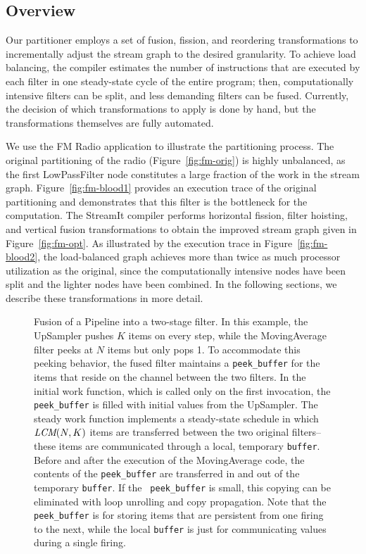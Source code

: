 \subsection{Overview}

Our partitioner employs a set of fusion, fission, and reordering
transformations to incrementally adjust the stream graph to the
desired granularity.  To achieve load balancing, the compiler
estimates the number of instructions that are executed by each filter
in one steady-state cycle of the entire program; then, computationally
intensive filters can be split, and less demanding filters can be
fused.  Currently, the decision of which transformations to apply is
done by hand, but the transformations themselves are fully automated.

We use the FM Radio application to illustrate the partitioning
process.  The original partitioning of the radio
(Figure~\ref{fig:fm-orig}) is highly unbalanced, as the first
LowPassFilter node constitutes a large fraction of the work in the
stream graph.  Figure~\ref{fig:fm-blood1} provides an execution trace
of the original partitioning and demonstrates that this filter is the
bottleneck for the computation.  The StreamIt compiler performs
horizontal fission, filter hoisting, and vertical fusion
transformations to obtain the improved stream graph given in
Figure~\ref{fig:fm-opt}.  As illustrated by the execution trace in
Figure~\ref{fig:fm-blood2}, the load-balanced graph achieves more than
twice as much processor utilization as the original, since the
computationally intensive nodes have been split and the lighter nodes
have been combined. In the following sections, we describe these
transformations in more detail.

\begin{figure}
\centering
{}
\vspace{-6pt}
\caption{\protect\small Fusion of a Pipeline into a two-stage filter.
In this example, the UpSampler pushes $K$ items on every step, while the
MovingAverage filter peeks at $N$ items but only pops 1.  To accommodate
this peeking behavior, the fused filter maintains a {\tt peek\_buffer}
for the items that reside on the channel between the two filters.  In
the initial work function, which is called only on the first
invocation, the {\tt peek\_buffer} is filled with initial values from
the UpSampler.  The steady work function implements a steady-state
schedule in which $\mbox{\it LCM}(N, K)$ items are transferred between the two
original filters--these items are communicated through a local,
temporary {\tt buffer}.  Before and after the execution of the
MovingAverage code, the contents of the {\tt peek\_buffer} are
transferred in and out of the temporary {\tt buffer}.  If the {\tt
peek\_buffer} is small, this copying can be eliminated with loop
unrolling and copy propagation.  Note that the {\tt peek\_buffer} is
for storing items that are persistent from one firing to the next,
while the local {\tt buffer} is just for communicating values during a
single firing. \label{fig:fuse-pipe}}
\vspace{-6pt}
\end{figure}

